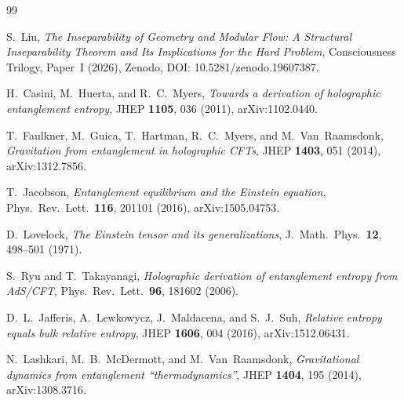 \documentclass[12pt]{article}
\theoremstyle{definition}
\theoremstyle{remark}
\begin{document}
\begin{thebibliography}{99}

S.~Liu,
\emph{The Inseparability of Geometry and Modular Flow: A Structural Inseparability Theorem and Its Implications for the Hard Problem},
Consciousness Trilogy, Paper~I (2026),
Zenodo, DOI: 10.5281/zenodo.19607387.

H.~Casini, M.~Huerta, and R.~C.~Myers,
\emph{Towards a derivation of holographic entanglement entropy},
JHEP \textbf{1105}, 036 (2011),
arXiv:1102.0440.

T.~Faulkner, M.~Guica, T.~Hartman, R.~C.~Myers, and M.~Van~Raamsdonk,
\emph{Gravitation from entanglement in holographic CFTs},
JHEP \textbf{1403}, 051 (2014),
arXiv:1312.7856.

T.~Jacobson,
\emph{Entanglement equilibrium and the Einstein equation},
Phys.\ Rev.\ Lett.\ \textbf{116}, 201101 (2016),
arXiv:1505.04753.

D.~Lovelock,
\emph{The Einstein tensor and its generalizations},
J.\ Math.\ Phys.\ \textbf{12}, 498--501 (1971).

S.~Ryu and T.~Takayanagi,
\emph{Holographic derivation of entanglement entropy from AdS/CFT},
Phys.\ Rev.\ Lett.\ \textbf{96}, 181602 (2006).

D.~L.~Jafferis, A.~Lewkowycz, J.~Maldacena, and S.~J.~Suh,
\emph{Relative entropy equals bulk relative entropy},
JHEP \textbf{1606}, 004 (2016),
arXiv:1512.06431.

N.~Lashkari, M.~B.~McDermott, and M.~Van~Raamsdonk,
\emph{Gravitational dynamics from entanglement ``thermodynamics''},
JHEP \textbf{1404}, 195 (2014),
arXiv:1308.3716.

\end{thebibliography}
 
\end{document}

